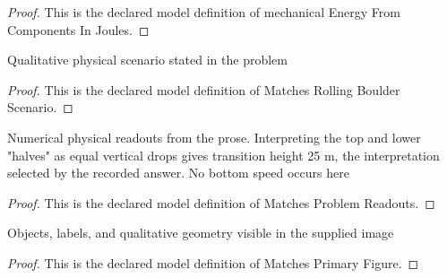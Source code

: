 \begin{proof}
  This is the declared model definition of mechanical Energy From Components In Joules.
\end{proof}
\begin{definition}
  \label{def:physics:phyx-mini-0789:phyxminiproblems-problemphyxmini0789-matchesrollingboulderscenario}
  Qualitative physical scenario stated in the problem
\end{definition}
\begin{proof}
  This is the declared model definition of Matches Rolling Boulder Scenario.
\end{proof}
\begin{definition}
  \label{def:physics:phyx-mini-0789:phyxminiproblems-problemphyxmini0789-matchesproblemreadouts}
  Numerical physical readouts from the prose. Interpreting the top and lower "halves" as equal vertical drops gives transition height 25 m, the interpretation selected by the recorded answer. No bottom speed occurs here
\end{definition}
\begin{proof}
  This is the declared model definition of Matches Problem Readouts.
\end{proof}
\begin{definition}
  \label{def:physics:phyx-mini-0789:phyxminiproblems-problemphyxmini0789-matchesprimaryfigure}
  Objects, labels, and qualitative geometry visible in the supplied image
\end{definition}
\begin{proof}
  This is the declared model definition of Matches Primary Figure.
\end{proof}
